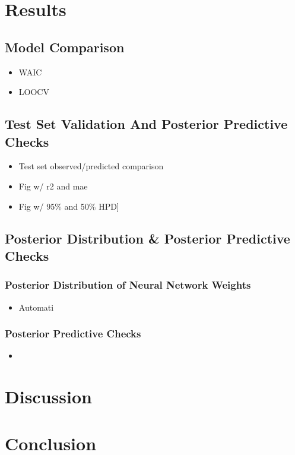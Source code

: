 \documentclass[10pt,a4paper]{article}
\begin{document}
	\section{Results}
		\subsection{Model Comparison}
			\begin{itemize}
				\item WAIC
				\item LOOCV
			\end{itemize}
		\subsection{Test Set Validation And Posterior Predictive Checks}
			\begin{itemize}
				\item Test set observed/predicted comparison 
				\item Fig w/ r2 and mae
				\item Fig w/ 95\% and 50\% HPD]
			\end{itemize}
		\subsection{Posterior Distribution \& Posterior Predictive Checks}
			\subsubsection{Posterior Distribution of Neural Network Weights}
			\begin{itemize}
				\item Automati
			\end{itemize}
			\subsubsection{Posterior Predictive Checks}
			\begin{itemize}
				\item 
			\end{itemize}
	\newpage
	\section{Discussion}
	\newpage
	\section{Conclusion}
	\newpage
\end{document}
